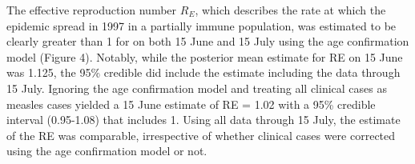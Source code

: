 The effective reproduction number $R_E$, which describes the rate at which the epidemic spread in 1997 in a partially immune population, was estimated to be clearly greater than 1 for on both 15 June and 15 July using the age confirmation model (Figure 4). Notably, while the posterior mean
estimate for RE on 15 June was 1.125, the 95\% credible did include the estimate including the data through 15 July. Ignoring the age
confirmation model and treating all clinical cases as measles cases yielded a 15 June estimate of RE = 1.02 with a 95\% credible interval
(0.95-1.08) that includes 1. Using all data through 15 July, the estimate of the RE was comparable, irrespective of whether clinical cases were corrected using the age confirmation model or not.